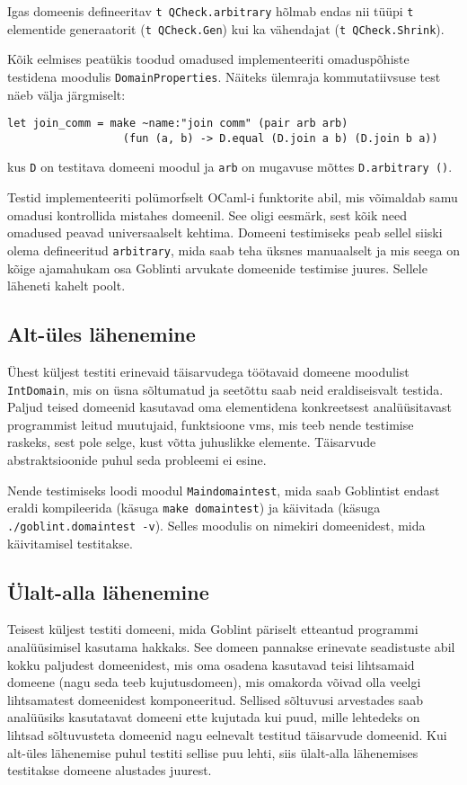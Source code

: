 \documentclass[../thesis.tex]{subfiles}
\begin{document}
Igas domeenis defineeritav \texttt{t QCheck.arbitrary} hõlmab endas nii tüüpi \texttt{t} elementide generaatorit (\texttt{t QCheck.Gen}) kui ka vähendajat (\texttt{t QCheck.Shrink}).

Kõik eelmises peatükis toodud omadused implementeeriti omaduspõhiste testidena moodulis \texttt{DomainProperties}. Näiteks ülemraja kommutatiivsuse test näeb välja järgmiselt:
\begin{verbatim}
let join_comm = make ~name:"join comm" (pair arb arb)
                  (fun (a, b) -> D.equal (D.join a b) (D.join b a))
\end{verbatim}
kus \texttt{D} on testitava domeeni moodul ja \texttt{arb} on mugavuse mõttes \texttt{D.arbitrary ()}.

Testid implementeeriti polümorfselt OCaml-i funktorite abil, mis võimaldab samu omadusi kontrollida mistahes domeenil. See oligi eesmärk, sest kõik need omadused peavad universaalselt kehtima. Domeeni testimiseks peab sellel siiski olema defineeritud \texttt{arbitrary}, mida saab teha üksnes manuaalselt ja mis seega on kõige ajamahukam osa Goblinti arvukate domeenide testimise juures. Sellele läheneti kahelt poolt.

\subsection{Alt-üles lähenemine}
Ühest küljest testiti erinevaid täisarvudega töötavaid domeene moodulist \texttt{IntDomain}, mis on üsna sõltumatud ja seetõttu saab neid eraldiseisvalt testida. Paljud teised domeenid kasutavad oma elementidena konkreetsest analüüsitavast programmist leitud muutujaid, funktsioone vms, mis teeb nende testimise raskeks, sest pole selge, kust võtta juhuslikke elemente. Täisarvude abstraktsioonide puhul seda probleemi ei esine.

Nende testimiseks loodi moodul \texttt{Maindomaintest}, mida saab Goblintist endast eraldi kompileerida (käsuga \texttt{make domaintest}) ja käivitada (käsuga \texttt{./goblint.domaintest -v}). Selles moodulis on nimekiri domeenidest, mida käivitamisel testitakse.

\subsection{Ülalt-alla lähenemine}
Teisest küljest testiti domeeni, mida Goblint päriselt etteantud programmi analüüsimisel kasutama hakkaks. See domeen pannakse erinevate seadistuste abil kokku paljudest domeenidest, mis oma osadena kasutavad teisi lihtsamaid domeene (nagu seda teeb kujutusdomeen), mis omakorda võivad olla veelgi lihtsamatest domeenidest komponeeritud. Sellised sõltuvusi arvestades saab analüüsiks kasutatavat domeeni ette kujutada kui puud, mille lehtedeks on lihtsad sõltuvusteta domeenid nagu eelnevalt testitud täisarvude domeenid. Kui alt-üles lähenemise puhul testiti sellise puu lehti, siis ülalt-alla lähenemises testitakse domeene alustades juurest.
\end{document}
